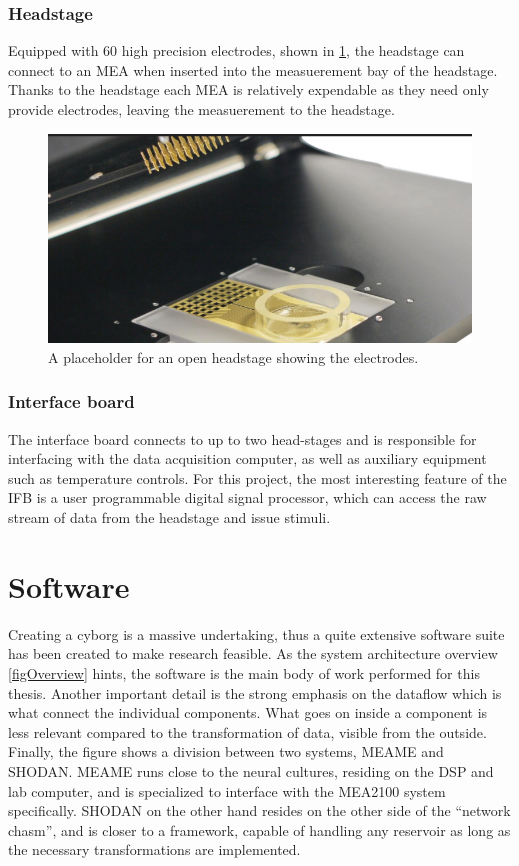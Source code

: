 \subsubsection{Headstage}
Equipped with 60 high precision electrodes, shown in \ref{openHeadstage}, the
headstage can connect to an MEA when inserted into the measuerement bay of the
headstage.
Thanks to the headstage each MEA is relatively expendable as they need only
provide electrodes, leaving the measuerement to the headstage.
\begin{figure}[h!]
  \centering
  \includegraphics[width=1\textwidth]{fig/hs_placeholder.png}
  \caption{
    A placeholder for an open headstage showing the electrodes.
  }
  \label{openHeadstage}
\end{figure}
\subsubsection{Interface board}
The interface board connects to up to two head-stages and is responsible for
interfacing with the data acquisition computer, as well as auxiliary equipment
such as temperature controls.
For this project, the most interesting feature of the IFB is a user programmable
digital signal processor, which can access the raw stream of data from the
headstage and issue stimuli.
\section{Software}
Creating a cyborg is a massive undertaking, thus a quite extensive software
suite has been created to make research feasible.
As the system architecture overview \ref{figOverview} hints, the software is the
main body of work performed for this thesis.
Another important detail is the strong emphasis on the dataflow which is what
connect the individual components.
What goes on inside a component is less relevant compared to the transformation
of data, visible from the outside.
Finally, the figure shows a division between two systems, MEAME and SHODAN.
MEAME runs close to the neural cultures, residing on the DSP and lab computer,
and is specialized to interface with the MEA2100 system specifically.
SHODAN on the other hand resides on the other side of the ``network chasm'', and
is closer to a framework, capable of handling any reservoir as long as the
necessary transformations are implemented.

